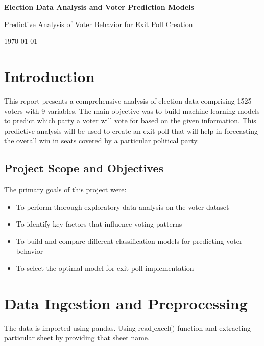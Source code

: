 \documentclass[12pt]{article}
\begin{document}
\begin{titlepage}
    \centering
    \vspace*{2cm}
    {\LARGE\bfseries Election Data Analysis and Voter Prediction Models\par}
    \vspace{2cm}
    {\Large Predictive Analysis of Voter Behavior for Exit Poll Creation\par}
    \vspace{4cm}
    {\large\today\par}
\end{titlepage}

\thispagestyle{empty}
\tableofcontents
\pagebreak

\listoffigures
\pagebreak

\listoftables
\pagebreak

\section{Introduction}
This report presents a comprehensive analysis of election data comprising 1525 voters with 9 variables. The main objective was to build machine learning models to predict which party a voter will vote for based on the given information. This predictive analysis will be used to create an exit poll that will help in forecasting the overall win in seats covered by a particular political party.

\subsection{Project Scope and Objectives}
The primary goals of this project were:
\begin{itemize}
    \item To perform thorough exploratory data analysis on the voter dataset
    \item To identify key factors that influence voting patterns
    \item To build and compare different classification models for predicting voter behavior
    \item To select the optimal model for exit poll implementation
\end{itemize}

\section{Data Ingestion and Preprocessing}

The data is imported using pandas. Using $\text{read\_excel()}$ function and extracting particular sheet by providing that sheet name.
\end{document}
